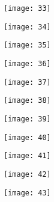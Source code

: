 \begin{figure}[H]
	\centering
	\texttt{[image: 33]}
\end{figure}

\begin{figure}[H]
	\centering
	\texttt{[image: 34]}
\end{figure}

\begin{figure}[H]
	\centering
	\texttt{[image: 35]}
\end{figure}

\begin{figure}[H]
	\centering
	\texttt{[image: 36]}
\end{figure}

\begin{figure}[H]
	\centering
	\texttt{[image: 37]}
\end{figure}

\begin{figure}[H]
	\centering
	\texttt{[image: 38]}
\end{figure}

\begin{figure}[H]
	\centering
	\texttt{[image: 39]}
\end{figure}


\begin{figure}[H]
	\centering
	\texttt{[image: 40]}
\end{figure}

\begin{figure}[H]
	\centering
	\texttt{[image: 41]}
\end{figure}

\begin{figure}[H]
	\centering
	\texttt{[image: 42]}
\end{figure}

\begin{figure}[H]
	\centering
	\texttt{[image: 43]}
\end{figure}

